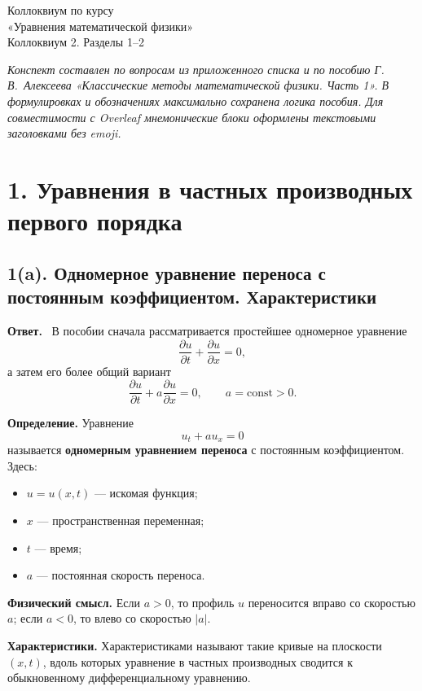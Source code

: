 \documentclass[a4paper,12pt]{article}
\newcommand{\Answer}{\textbf{Ответ.}\ }
\begin{document}
\begin{center}
{\LARGE Коллоквиум по курсу}\\[0.2em]
{\LARGE «Уравнения математической физики»}\\[0.8em]
{\large Коллоквиум 2. Разделы 1--2}
\end{center}

\vspace{0.8em}
\textit{Конспект составлен по вопросам из приложенного списка и по пособию Г.\,В.~Алексеева «Классические методы математической физики. Часть 1». В формулировках и обозначениях максимально сохранена логика пособия. Для совместимости с Overleaf мнемонические блоки оформлены текстовыми заголовками без emoji.}

\section*{1. Уравнения в частных производных первого порядка}

\subsection*{1(a). Одномерное уравнение переноса с постоянным коэффициентом. Характеристики}

\Answer
В пособии сначала рассматривается простейшее одномерное уравнение
\[
\frac{\partial u}{\partial t}+\frac{\partial u}{\partial x}=0,
\]
а затем его более общий вариант
\[
\frac{\partial u}{\partial t}+a\frac{\partial u}{\partial x}=0,
\qquad a=\mathrm{const}>0.
\]

\textbf{Определение.} Уравнение
\[
u_t+a u_x=0
\]
называется \textbf{одномерным уравнением переноса} с постоянным коэффициентом. Здесь:
\begin{itemize}
  \item $u=u(x,t)$ --- искомая функция;
  \item $x$ --- пространственная переменная;
  \item $t$ --- время;
  \item $a$ --- постоянная скорость переноса.
\end{itemize}

\textbf{Физический смысл.} Если $a>0$, то профиль $u$ переносится вправо со скоростью $a$; если $a<0$, то влево со скоростью $|a|$.

\textbf{Характеристики.} Характеристиками называют такие кривые на плоскости $(x,t)$, вдоль которых уравнение в частных производных сводится к обыкновенному дифференциальному уравнению.
\end{document}
